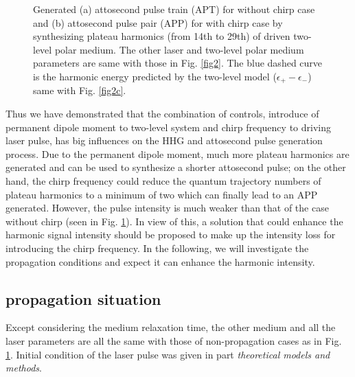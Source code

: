 \documentclass[10pt,letterpaper]{article}
\begin{document}
\begin{figure}[!htbp]
	\centering
	\caption{Generated (a) attosecond pulse train (APT) for without chirp case and (b) attosecond pulse pair (APP) for with chirp case by synthesizing plateau harmonics (from 14th to 29th) of driven two-level polar medium. The other laser and two-level polar medium parameters are same with those in Fig. \ref{fig2}. The blue dashed curve is the harmonic energy predicted by the two-level model ($\epsilon_{+}-\epsilon_{-}$) same with Fig. \ref{fig2c}.}
	\label{fig3}
\end{figure}
	
Thus we have demonstrated that the combination of controls, introduce of permanent dipole moment to two-level system and chirp frequency to driving laser pulse, has big influences on the HHG and attosecond pulse generation process. Due to the permanent dipole moment, much more plateau harmonics are generated and can be used to synthesize a shorter attosecond pulse; on the other hand, the chirp frequency could reduce the quantum trajectory numbers of plateau harmonics to a minimum of two which can finally lead to an APP generated. However, the pulse intensity is much weaker than that of the case without chirp (seen in Fig. \ref{fig3}). In view of this, a solution that could enhance the harmonic signal intensity should be proposed to make up the intensity loss for introducing the chirp frequency. In the following, we will investigate the propagation conditions and expect it can enhance the harmonic intensity. 
\subsection{propagation situation}
Except considering the medium relaxation time, the other medium and all the laser parameters are all the same with those of non-propagation cases as in Fig. \ref{fig3}. Initial condition of the laser pulse was given in part \emph{theoretical models and methods}. 
\end{document}
